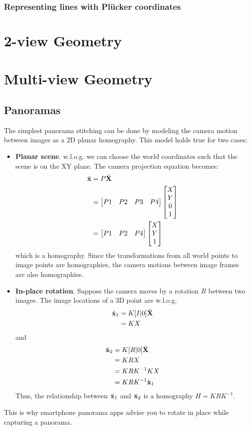 \subsubsection{Representing lines with Pl\"ucker coordinates}

\section{2-view Geometry}

\section{Multi-view Geometry}

\subsection{Panoramas}
The simplest panorama stitching can be done by modeling the camera motion between images as a 2D planar homography. This model holds true for two cases:
\begin{itemize}
\item \textbf{Planar scene}. w.l.o.g. we can choose the world coordinates such that the scene is on the XY plane. The camera projection equation becomes:
\begin{align}
\tilde{\mathbf{x}}
&= P \tilde{\mathbf{X}}\\
&= \begin{bmatrix} P1 & P2 & P3 & P4\end{bmatrix} \begin{bmatrix} X\\Y\\0\\1 \end{bmatrix}\\
&= \begin{bmatrix} P1 & P2 & P4\end{bmatrix} \begin{bmatrix} X\\Y\\1 \end{bmatrix}
\end{align}
which is a homography. Since the transformations from all world points to image points are homographies, the camera motions between image frames are also homographies.
\item \textbf{In-place rotation}. Suppose the camera moves by a rotation $R$ between two images. The image locations of a 3D point  are w.l.o.g.
\begin{align}
\tilde{\mathbf{x}}_1
&= K[I | 0]\tilde{\mathbf{X}}\\
&= KX
\end{align}
and
\begin{align}
\tilde{\mathbf{x}}_2
&= K[R | 0]\tilde{\mathbf{X}}\\
&= KRX\\
&= KRK^{-1}KX\\
&= KRK^{-1}\tilde{\mathbf{x}}_1
\end{align}
Thus, the relationship between $\tilde{\mathbf{x}}_1$ and $\tilde{\mathbf{x}}_2$ is a homography $H=KRK^{-1}$.
\end{itemize}
This is why smartphone panorama apps advise you to rotate in place while capturing a panorama.
